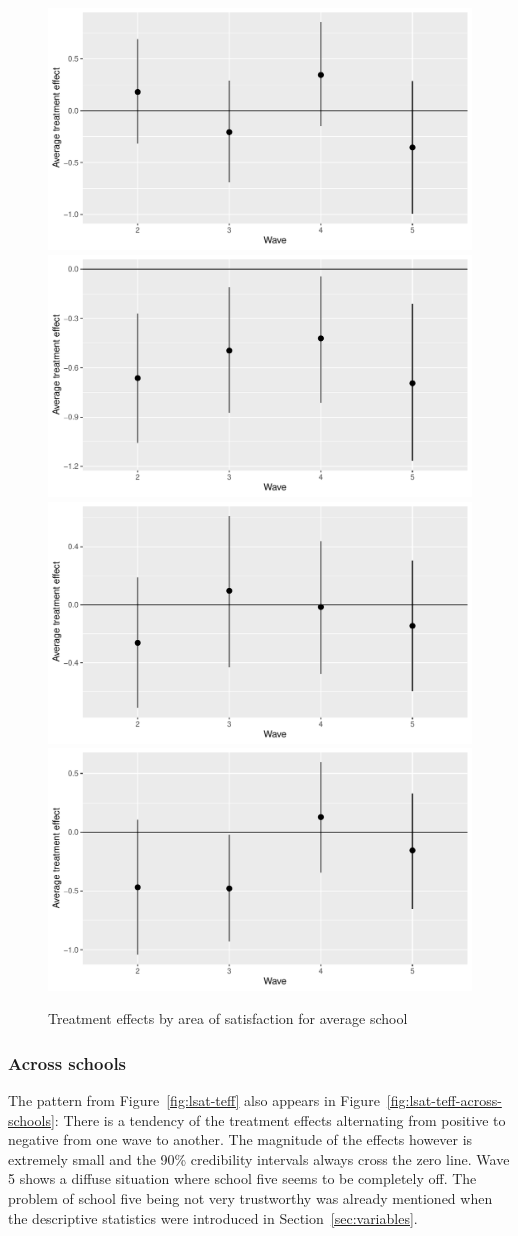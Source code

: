 \documentclass[a4, 12pt]{article}
\begin{document}
\begin{figure}[H]
\includegraphics[width=0.5\linewidth,]{../figures/lsat_teff} \includegraphics[width=0.5\linewidth,]{../figures/sat_friends_teff} \includegraphics[width=0.5\linewidth,]{../figures/sat_class_teff} \includegraphics[width=0.5\linewidth,]{../figures/sat_school_teff} \caption{Treatment effects by area of satisfaction for average school}\label{fig:sat-teff}
\end{figure}

\hypertarget{across-schools}{%
\subsubsection{Across schools}\label{across-schools}}

The pattern from Figure~\ref{fig:lsat-teff} also appears in Figure~\ref{fig:lsat-teff-across-schools}: There is a tendency of the treatment effects alternating from positive to negative from one wave to another. The magnitude of the effects however is extremely small and the 90\% credibility intervals always cross the zero line. Wave 5 shows a diffuse situation where school five seems to be completely off. The problem of school five being not very trustworthy was already mentioned when the descriptive statistics were introduced in Section~\ref{sec:variables}.
\end{document}
